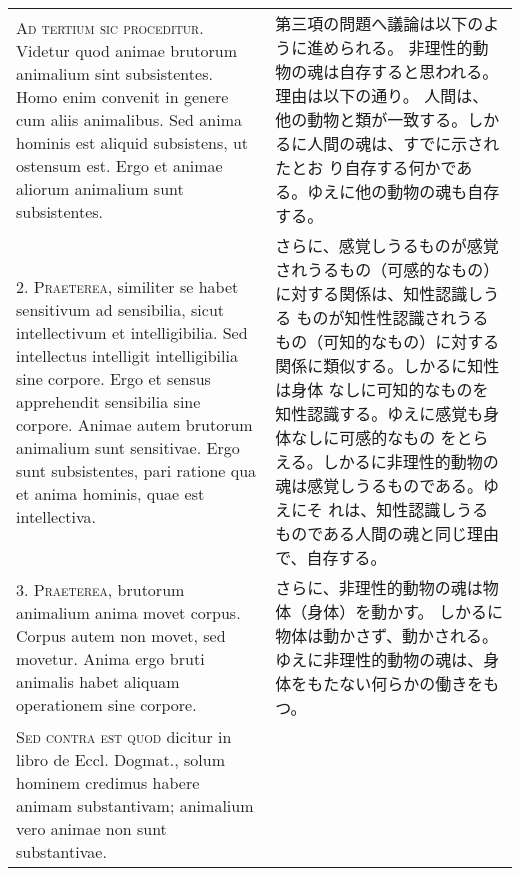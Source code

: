 \documentclass[paper=a4paper,fontsize=10pt,jafontsize=9pt,titlepage]{jlreq}
\begin{document}
\begin{longtable}{p{21em}p{21em}}

{\scshape Ad tertium sic proceditur}. Videtur quod animae brutorum animalium sint
subsistentes. Homo enim convenit in genere cum aliis animalibus. Sed
anima hominis est aliquid subsistens, ut ostensum est. Ergo et animae
aliorum animalium sunt subsistentes.

&

第三項の問題へ議論は以下のように進められる。
非理性的動物の魂は自存すると思われる。理由は以下の通り。
人間は、他の動物と類が一致する。しかるに人間の魂は、すでに示されたとお
 り自存する何かである。ゆえに他の動物の魂も自存する。

\\



2. {\scshape Praeterea}, similiter se habet sensitivum ad sensibilia, sicut
intellectivum et intelligibilia. Sed intellectus intelligit
intelligibilia sine corpore. Ergo et sensus apprehendit sensibilia
sine corpore. Animae autem brutorum animalium sunt sensitivae. Ergo
sunt subsistentes, pari ratione qua et anima hominis, quae est
intellectiva.

&


さらに、感覚しうるものが感覚されうるもの（可感的なもの）に対する関係は、知性認識しうる
 ものが知性性認識されうるもの（可知的なもの）に対する関係に類似する。しかるに知性は身体
 なしに可知的なものを知性認識する。ゆえに感覚も身体なしに可感的なもの
 をとらえる。しかるに非理性的動物の魂は感覚しうるものである。ゆえにそ
 れは、知性認識しうるものである人間の魂と同じ理由で、自存する。


\\



3. {\scshape Praeterea}, brutorum animalium anima movet corpus. Corpus autem non
movet, sed movetur. Anima ergo bruti animalis habet aliquam
operationem sine corpore.

&

さらに、非理性的動物の魂は物体（身体）を動かす。
しかるに物体は動かさず、動かされる。
ゆえに非理性的動物の魂は、身体をもたない何らかの働きをもつ。

\\



{\scshape Sed contra est quod} dicitur in libro de Eccl. Dogmat., solum hominem
credimus habere animam substantivam; animalium vero animae non sunt
substantivae.

&


\end{longtable}
\end{document}
